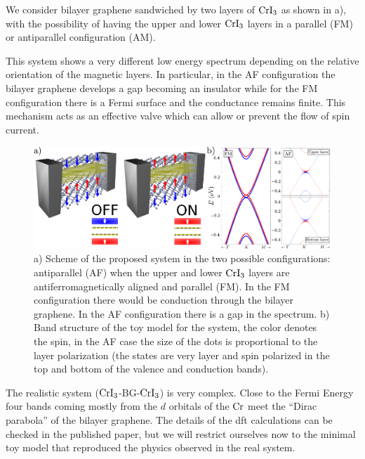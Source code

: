 We consider bilayer graphene sandwiched by two layers of $\ce{CrI_3}$ as shown in a), with the possibility of having the upper and lower $\ce{CrI_3}$ layers in a parallel (FM) or antiparallel configuration (AM).

This system shows a very different low energy  spectrum depending on the relative orientation of the magnetic layers. In particular, in the AF configuration the bilayer graphene develops a gap becoming an insulator while for the FM configuration there is a Fermi surface and the conductance remains finite. This mechanism acts as an effective valve which can allow or prevent the flow of spin current.

\begin{figure}[h!]
\centering
\includegraphics{graphene_bilayer/figures/cri3_valve.pdf}
\vspace{-5pt}
\caption{a) Scheme of the proposed system in the two possible configurations: antiparallel (AF) when the upper and lower $\ce{CrI_3}$ layers are antiferromagnetically aligned and parallel (FM). In the FM configuration there would be conduction through the bilayer graphene. In the AF configuration there is a gap in the spectrum. b) Band structure of the toy model for the system, the color denotes the spin, in the AF case the size of the dots is proportional to the layer polarization (the states are very layer and spin polarized in the top and bottom of the valence and conduction bands).}
\label{cri3}
\end{figure}

The realistic system ($\ce{CrI_3}$-BG-$\ce{CrI_3}$) is very complex. Close to the Fermi Energy four bands coming mostly from the $d$ orbitals of the $\ce{Cr}$ meet the ``Dirac parabola'' of the bilayer graphene. The details of the \ac{dft} calculations can be checked in the published paper\cite{Cardoso2018}, but we will restrict ourselves now to the minimal toy model that reproduced the physics observed in the real system.



